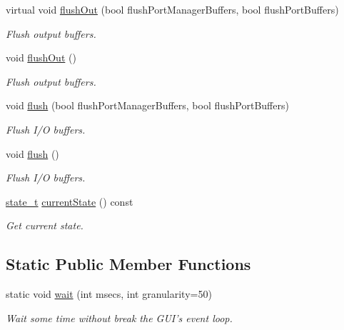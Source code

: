 \begin{DoxyCompactItemize}
virtual void \hyperlink{classmdt_port_manager_a3f0c2722a41c49de2bea9013bccd049c}{flushOut} (bool flushPortManagerBuffers, bool flushPortBuffers)
\begin{DoxyCompactList}\small\item\em Flush output buffers. \end{DoxyCompactList}\item 
void \hyperlink{classmdt_port_manager_ab34018a9653a5af784fa7da06a9e50d3}{flushOut} ()
\begin{DoxyCompactList}\small\item\em Flush output buffers. \end{DoxyCompactList}\item 
void \hyperlink{classmdt_port_manager_a97b91e7c1641836eb6afb47fd244a18e}{flush} (bool flushPortManagerBuffers, bool flushPortBuffers)
\begin{DoxyCompactList}\small\item\em Flush I/O buffers. \end{DoxyCompactList}\item 
void \hyperlink{classmdt_port_manager_a3eab774008d7530ae341ce9c38265d65}{flush} ()
\begin{DoxyCompactList}\small\item\em Flush I/O buffers. \end{DoxyCompactList}\item 
\hypertarget{classmdt_port_manager_a59241d9e6b6ee71e6c1aeb3e6c0ca81a}{
\hyperlink{classmdt_port_manager_a9448339d7f08ca5e18b904df25b382da}{state\_\-t} \hyperlink{classmdt_port_manager_a59241d9e6b6ee71e6c1aeb3e6c0ca81a}{currentState} () const }
\label{classmdt_port_manager_a59241d9e6b6ee71e6c1aeb3e6c0ca81a}

\begin{DoxyCompactList}\small\item\em Get current state. \end{DoxyCompactList}\end{DoxyCompactItemize}
\subsection*{Static Public Member Functions}
\begin{DoxyCompactItemize}
\item 
static void \hyperlink{classmdt_port_manager_acc5c63ad33fdd3cc153fc23e00c6e69c}{wait} (int msecs, int granularity=50)
\begin{DoxyCompactList}\small\item\em Wait some time without break the GUI's event loop. \end{DoxyCompactList}\end{DoxyCompactItemize}
